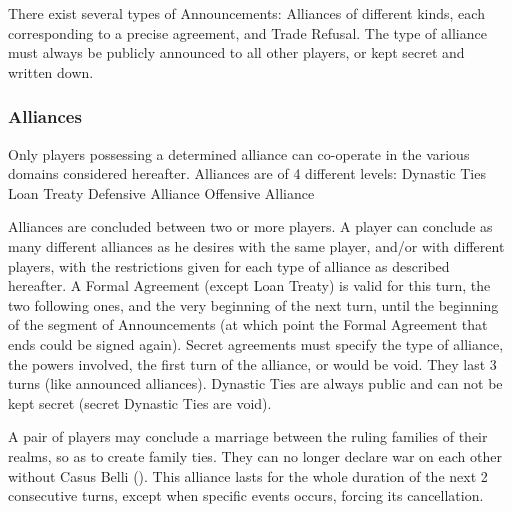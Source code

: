 
\aparag There exist several types of Announcements: Alliances of different
kinds, each corresponding to a precise agreement, and Trade Refusal. The type
of alliance must always be publicly announced to all other players, or kept
secret and written down.


\subsubsection{Alliances}
\aparag Only players possessing a determined alliance can co-operate in the
various domains considered hereafter. Alliances are of 4 different levels:
\bparag Dynastic Ties
\bparag Loan Treaty
\bparag Defensive Alliance
\bparag Offensive Alliance

\aparag[Generalities]
Alliances are concluded between two or more players. A player can conclude as
many different alliances as he desires with the same player, and/or with
different players, with the restrictions given for each type of alliance as
described hereafter.
\bparag A Formal Agreement (except Loan Treaty) is valid for this turn, the
two following ones, and the very beginning of the next turn, until the
beginning of the segment of Announcements (at which point the Formal Agreement
that ends could be signed again).
\bparag Secret agreements must specify the type of alliance, the powers
involved, the first turn of the alliance, or would be void. They last 3 turns
(like announced alliances). Dynastic Ties are always public and can not be
kept secret (secret Dynastic Ties are void).

\label{chDiplo:Alliance:Dynastic Alliance}
A pair of players may conclude a marriage between the ruling families of their
realms, so as to create family ties. They can no longer declare war on each
other without Casus Belli (\CB). This alliance lasts for the whole duration of
the next 2 consecutive turns, except when specific events occurs, forcing its
cancellation.

